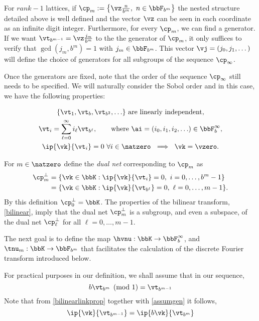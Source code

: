 \documentclass[]{elsarticle}
\theoremstyle{definition}
\begin{document}
For $rank-1$ lattices, if $\cp_m :=\left\{\vz\frac{n}{b^m},\ n\in\bbF_{b^m}\right\}$ the nested structure detailed above is well defined and the vector $\vz$ can be seen in each coordinate as an infinite digit integer. Furthermore, for every $\cp_m$, we can find a generator. If we want $\vt_{b^{m-1}}=\vz\frac{j_m}{b^m}$ to the the generator of $\cp_m$, it only suffices to verify that $\gcd(j_m,b^m)=1$ with $j_m\in\bbF_{b^m}$. This vector $\vj=(j_0,j_1,\dots)$ will define the choice of generators for all subgroups of the sequence $\cp_\infty$.

Once the generators are fixed, note that the order of the sequence $\cp_\infty$ still needs to be specified. We will naturally consider the Sobol order and in this case, we have the following properties:

\begin{subequations} \label{cpinfvector}
\begin{gather}
\{\vt_{1}, \vt_{b}, \vt_{b^2}, \ldots\} \text{ are linearly independent}, \\
\vt_i = \sum_{\ell=0}^{\infty} i_\ell \vt_{b^\ell}, \qquad \text{where }\ai=(i_0, i_1, i_2, \ldots ) \in \bbF_b^\infty, \\
\ip{\vk}{\vt_i} =  0 \ \forall i \in \natzero   \ \implies \ \vk=\vzero. \label{netpropc}
\end{gather}
\end{subequations}

For $m \in \natzero$ define the \emph{dual net} corresponding to $\cp_m$ as
\begin{align*}
\cp^{\perp}_m &= \{\vk \in \bbK : \ip{\vk}{\vt_i} = 0, \ i=0, \ldots, b^m-1\} \\
&= \{\vk \in \bbK : \ip{\vk}{\vt_{b^{\ell}}} = 0, \ \ell=0, \ldots, m-1\}.
\end{align*}
By this definition $\cp^{\perp}_{0}=\bbK$.  The properties of the bilinear transform, \eqref{bilinear}, imply that the dual net $\cp^{\perp}_m$ is a subgroup, and even a subspace, of the dual net $\cp^{\perp}_\ell$ for all $\ell=0, \ldots, m-1$.

The next goal is to define the map $\hvnu : \bbK \to \bbF_b^{\infty}$, and $\tnu_m : \bbK \to \bbF_{b^m}$ that facilitates the calculation of the discrete Fourier transform introduced below.

For practical purposes in our definition, we shall assume that in our sequence,
\begin{equation}\label{assumgen}
b\vt_{b^m}\pmod 1=\vt_{b^{m-1}}
\end{equation}
Note that from \eqref{bilinearlinkprop} together with \eqref{assumgen} it follows,
\begin{equation}\label{assumgenip}
\ip{\vk}{\vt_{b^{m-1}}}=\ip{b\vk}{\vt_{b^m}}
\end{equation}
\end{document}
